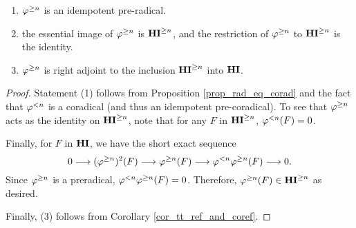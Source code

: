 \begin{prop}\label{prop_tgHI_reflection}
\begin{enumerate}
\item $\varphi^{\geq n}$ is an idempotent pre-radical.
\tinyskip

\item the essential image of $\varphi^{\geq n}$ is $\mathbf{HI}^{\geq n}$, and the 
restriction of $\varphi^{\geq n}$ to $\mathbf{HI}^{\geq n}$ is the identity.
\tinyskip

\item $\varphi^{\geq n}$ is right adjoint to the inclusion $\mathbf{HI}^{\geq n}$ into
$\mathbf{HI}$.
\tinyskip
\end{enumerate}
\end{prop}
\begin{proof}
Statement (1) follows from Proposition \ref{prop_rad_eq_corad} and
the fact that $\varphi^{< n}$ is a coradical (and thus an idempotent 
pre-coradical). To see that $\varphi^{\geq n}$ acts as the identity on 
$\mathbf{HI}^{\geq n}$, note that for any $F$ in $\mathbf{HI}^{\geq n}$, $\varphi^{< n}(F) = 0$. 

Finally, for $F$ in $\mathbf{HI}$, we have the short exact sequence
\[
0 \longrightarrow (\varphi^{\geq n})^2(F) \longrightarrow \varphi^{\geq n}(F) \longrightarrow \varphi^{< n} \varphi^{\geq n}(F) 
\longrightarrow 0.
\]
Since $\varphi^{\geq n}$ is a preradical, $\varphi^{< n} \varphi^{\geq n}(F) = 0$. 
Therefore, $\varphi^{\geq n}(F) \in \mathbf{HI}^{\geq n}$ as desired.

Finally, (3) follows from Corollary \ref{cor_tt_ref_and_coref}.
\end{proof}

